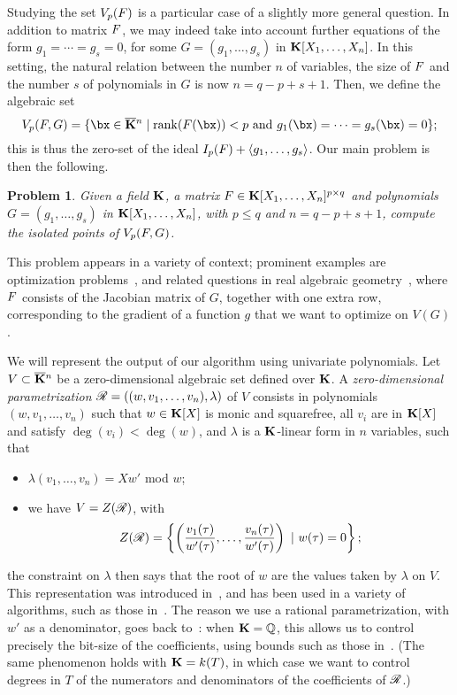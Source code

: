 \documentclass[12pt]{article}
\newtheorem{pbm}{Problem}
\begin{document}
Studying the set $V_{p}({F})$ is a particular case of a slightly
more general question. In addition to matrix ${F}$, we may indeed take
into account further equations of the form $g_1 =\cdots=g_s=0$, for
some $G=(g_1,\dots,g_s)$ in $\mathbf{K}[X_1,\dots,X_n]$. In this setting, the
natural relation between the number $n$ of variables, the size of
${F}$ and the number $s$ of polynomials in $G$ is now
$n=q-p+s+1$. Then, we define the algebraic set
$$\VpFG{p}{\mF}{G} = \{\bx \in \KKbar{}^n \mid
\mathrm{rank}(\mF({\bx})) < p \text{~and~} g_1(\bx)=\cdots=g_s(\bx)=0
\};$$ this is thus the zero-set of the ideal $I_p({F}) + \langle
g_1,\dots,g_s\rangle$.  Our main problem is then the following.
\begin{pbm} \label{problem2} 
  Given a field $\mathbf{K}$, a matrix ${F} \in \mathbf{K}[X_1,\dots,X_n]^{p \times q}$ and
  polynomials $G=(g_1,\dots,g_s)$ in $\mathbf{K}[X_1,\dots,X_n]$, with $p \leq q$ and
  $n = q-p+s+1$, compute the isolated points of $V_{p}({F},G)$.
\end{pbm}
This problem appears in a variety of context; prominent examples are
optimization problems~\cite{xxx}, and related questions in real
algebraic geometry~\cite{xxx}, where ${F}$ consists of the Jacobian
matrix of $G$, together with one extra row, corresponding to the
gradient of a function $g$ that we want to optimize on $V(G)$.

We will represent the output of our algorithm using univariate
polynomials. Let $V \subset \overline{\mathbf{K}}{}^n$ be a zero-dimensional
algebraic set defined over $\mathbf{K}$. A \emph{zero-dimensional
  parametrization} $\mathscr{R} = ((w,v_1, \ldots, v_n), \lambda)$ of $V$
consists in polynomials $(w,v_1, \ldots, v_n)$ such that $w \in
\mathbf{K}[X]$ is monic and squarefree, all $v_i$ are in $\mathbf{K}[X]$ and satisfy
$\deg(v_i) < \deg(w)$, and $\lambda$ is a $\mathbf{K}$-linear form in $n$
variables, such that
\begin{itemize}
\item $\lambda(v_1, \ldots, v_n) = Xw'$ mod $w$;
\item we have $V = Z(\mathscr{R})$, with $$Z(\mathscr{R})= \left\{\left(\frac{v_1(\tau)}{w'(\tau)}, \ldots, \frac{v_n(\tau)}{w'(\tau)}\right) \ | \ w(\tau) = 0\right\};$$
\end{itemize}
the constraint on $\lambda$ then says that the root of $w$ are the values
taken by $\lambda$ on $V$. This representation was introduced
in~\cite{Kronecker82,Macaulay16}, and has been used in a variety of
algorithms, such
as those in~\cite{GiMo89,GiHeMoPa95,ABRW,GiHeMoMoPa98,Rouillier99,GiLeSa01}.
The reason we use a rational parametrization, with $w'$ as a
denominator, goes back to~\cite{ABRW, Rouillier99, GiLeSa01}: when
$\mathbf{K}=\mathbb{Q}$, this allows us to control precisely the bit-size of the
coefficients, using bounds such as those
in~\cite{Schost03,DaSc04}. (The same phenomenon holds with $\mathbf{K}=k(T)$,
in which case we want to control degrees in $T$ of the numerators and
denominators of the coefficients of $\mathscr{R}$.)
\end{document}
